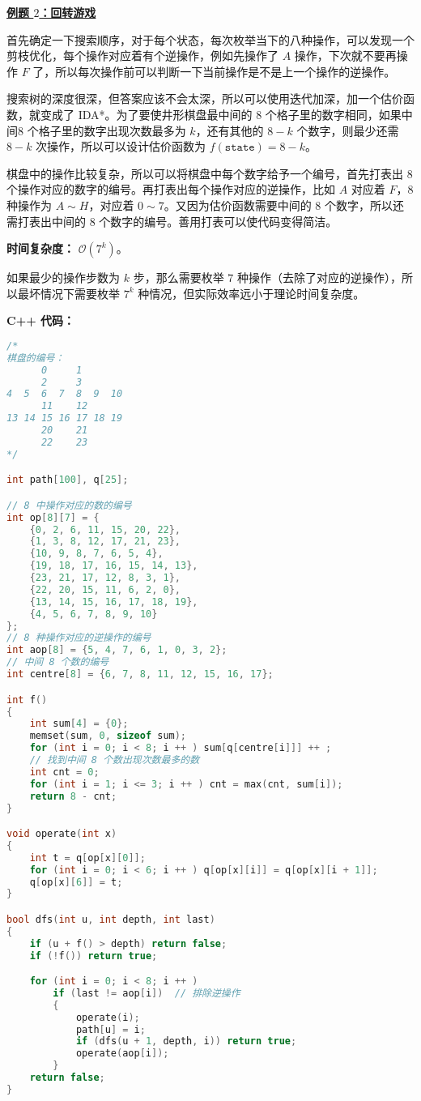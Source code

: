 \textbf{\href{http://poj.org/problem?id=2286}{例题 $2$：回转游戏}}

首先确定一下搜索顺序，对于每个状态，每次枚举当下的八种操作，可以发现一个剪枝优化，每个操作对应着有个逆操作，例如先操作了 $A$ 操作，下次就不要再操作 $F$ 了，所以每次操作前可以判断一下当前操作是不是上一个操作的逆操作。

搜索树的深度很深，但答案应该不会太深，所以可以使用迭代加深，加一个估价函数，就变成了 IDA*。为了要使井形棋盘最中间的 $8$ 个格子里的数字相同，如果中间$8$ 个格子里的数字出现次数最多为 $k$，还有其他的 $8 - k$ 个数字，则最少还需 $8 - k$ 次操作，所以可以设计估价函数为 $f(\texttt{state}) = 8 - k$。

棋盘中的操作比较复杂，所以可以将棋盘中每个数字给予一个编号，首先打表出 $8$ 个操作对应的数字的编号。再打表出每个操作对应的逆操作，比如 $A$ 对应着 $F$，$8$ 种操作为 $A \sim H$，对应着 $0 \sim 7$。又因为估价函数需要中间的 $8$ 个数字，所以还需打表出中间的 $8$ 个数字的编号。善用打表可以使代码变得简洁。

\textbf{时间复杂度：} $\mathcal{O}(7^k)$。

如果最少的操作步数为 $k$ 步，那么需要枚举 $7$ 种操作（去除了对应的逆操作），所以最坏情况下需要枚举 $7^k$ 种情况，但实际效率远小于理论时间复杂度。

\textbf{C++ 代码：}
\begin{lstlisting}[language=cpp]
/*
棋盘的编号：
      0     1
      2     3
4  5  6  7  8  9  10
      11    12
13 14 15 16 17 18 19
      20    21
      22    23
*/

int path[100], q[25];

// 8 中操作对应的数的编号
int op[8][7] = {
    {0, 2, 6, 11, 15, 20, 22},
    {1, 3, 8, 12, 17, 21, 23},
    {10, 9, 8, 7, 6, 5, 4},
    {19, 18, 17, 16, 15, 14, 13},
    {23, 21, 17, 12, 8, 3, 1},
    {22, 20, 15, 11, 6, 2, 0},
    {13, 14, 15, 16, 17, 18, 19},
    {4, 5, 6, 7, 8, 9, 10}
};
// 8 种操作对应的逆操作的编号
int aop[8] = {5, 4, 7, 6, 1, 0, 3, 2};
// 中间 8 个数的编号
int centre[8] = {6, 7, 8, 11, 12, 15, 16, 17};

int f()
{
    int sum[4] = {0};
    memset(sum, 0, sizeof sum);
    for (int i = 0; i < 8; i ++ ) sum[q[centre[i]]] ++ ;
    // 找到中间 8 个数出现次数最多的数
    int cnt = 0;
    for (int i = 1; i <= 3; i ++ ) cnt = max(cnt, sum[i]);
    return 8 - cnt;
}

void operate(int x)
{
    int t = q[op[x][0]];
    for (int i = 0; i < 6; i ++ ) q[op[x][i]] = q[op[x][i + 1]];
    q[op[x][6]] = t;
}

bool dfs(int u, int depth, int last)
{
    if (u + f() > depth) return false;
    if (!f()) return true;

    for (int i = 0; i < 8; i ++ )
        if (last != aop[i])  // 排除逆操作
        {
            operate(i);
            path[u] = i;
            if (dfs(u + 1, depth, i)) return true;
            operate(aop[i]);
        }
    return false;
}
\end{lstlisting}